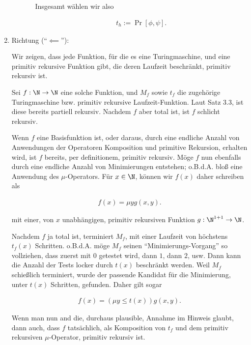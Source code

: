 \begin{solution}
\begin{enumerate}[wide, labelindent = 0pt]
\begin{itemize}
\begin{itemize}
            Insgesamt wählen wir also

            \begin{align*}
                t_h
                :=
                \Pr[\phi, \psi].
            \end{align*}

        \end{itemize}

    \end{itemize}

    \item Richtung (\enquote{$\impliedby$}):
    
    Wir zeigen, dass jede Funktion, für die es eine Turingmaschine, und eine primitiv rekursive Funktion gibt, die deren Laufzeit beschränkt, primitiv rekursiv ist.

    Sei $f: \N \to \N$ eine solche Funktion, und $M_f$ sowie $t_f$ die zugehörige Turingmaschine bzw. primitiv rekursive Laufzeit-Funktion.
    Laut Satz 3.3, ist diese bereits partiell rekursiv.
    Nachdem $f$ aber total ist, ist $f$ schlicht rekursiv.

    Wenn $f$ eine Basisfunktion ist, oder daraus, durch eine endliche Anzahl von Anwendungen der Operatoren Komposition und primitive Rekursion, erhalten wird, ist $f$ bereits, per definitionem, primitiv rekursiv.
    Möge $f$ nun ebenfalls durch eine endliche Anzahl von Minimierungen entstehen;
    o.B.d.A. bloß eine Anwendung des $\mu$-Operators.
    Für $x \in \N$, können wir $f(x)$ daher schreiben als

    \begin{align*}
        f(x)
        =
        \mu y g(x, y).
    \end{align*}

    mit einer, von $x$ unabhängigen, primitiv rekursiven Funktion $g: \N^{1+1} \to \N$.

    Nachdem $f$ ja total ist, terminiert $M_f$, mit einer Laufzeit von höchstens $t_f(x)$ Schritten.
    o.B.d.A. möge $M_f$ seinen \enquote{Minimierungs-Vorgang} so vollziehen, dass zuerst mit $0$ getestet wird, dann $1$, dann $2$, usw.
    Dann kann die Anzahl der Tests locker durch $t(x)$ beschränkt werden.
    Weil $M_f$ schießlich terminiert, wurde der passende Kandidat für die Minimierung, unter $t(x)$ Schritten, gefunden.
    Daher gilt sogar

    \begin{align*}
        f(x)
        =
        (\mu y \leq t(x)) g(x, y).
    \end{align*}

    Wenn man nun and die, durchaus plausible, Annahme im Hinweis glaubt, dann auch, dass $f$ tatsächlich, als Komposition von $t_f$ und dem primitiv rekursiven $\mu$-Operator, primitiv rekursiv ist.

\end{enumerate}

\end{solution}

